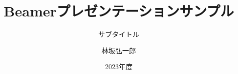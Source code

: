 \documentclass[12pt,dvipdfmx,aspectratio=169]{beamer}
\title{Beamerプレゼンテーションサンプル}
\subtitle{サブタイトル}
\author{林坂弘一郎}
\date{2023年度}
\institute[神戸学院大学]{神戸学院大学 経営学部}
\theoremstyle{example}
\begin{document}
\frame{\titlepage}
\section[Outline]{}
\frame{\tableofcontents}

\end{document}
